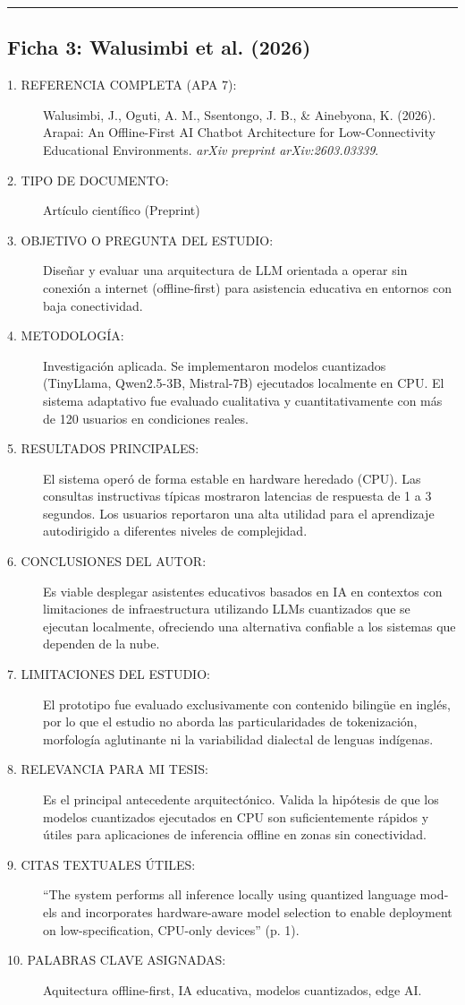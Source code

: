 \vspace{0.5cm}
\hrule
\vspace{0.5cm}

\subsection*{Ficha 3: Walusimbi et al. (2026)}
\begin{description}
	\item[1. REFERENCIA COMPLETA (APA 7):] Walusimbi, J., Oguti, A. M., Ssentongo, J. B., \& Ainebyona, K. (2026). Arapai: An Offline-First AI Chatbot Architecture for Low-Connectivity Educational Environments. \textit{arXiv preprint arXiv:2603.03339}.
	\item[2. TIPO DE DOCUMENTO:] Artículo científico (Preprint)
	\item[3. OBJETIVO O PREGUNTA DEL ESTUDIO:] Diseñar y evaluar una arquitectura de LLM orientada a operar sin conexión a internet (offline-first) para asistencia educativa en entornos con baja conectividad.
	\item[4. METODOLOGÍA:] Investigación aplicada. Se implementaron modelos cuantizados (TinyLlama, Qwen2.5-3B, Mistral-7B) ejecutados localmente en CPU. El sistema adaptativo fue evaluado cualitativa y cuantitativamente con más de 120 usuarios en condiciones reales.
	\item[5. RESULTADOS PRINCIPALES:] El sistema operó de forma estable en hardware heredado (CPU). Las consultas instructivas típicas mostraron latencias de respuesta de 1 a 3 segundos. Los usuarios reportaron una alta utilidad para el aprendizaje autodirigido a diferentes niveles de complejidad.
	\item[6. CONCLUSIONES DEL AUTOR:] Es viable desplegar asistentes educativos basados en IA en contextos con limitaciones de infraestructura utilizando LLMs cuantizados que se ejecutan localmente, ofreciendo una alternativa confiable a los sistemas que dependen de la nube.
	\item[7. LIMITACIONES DEL ESTUDIO:] El prototipo fue evaluado exclusivamente con contenido bilingüe en inglés, por lo que el estudio no aborda las particularidades de tokenización, morfología aglutinante ni la variabilidad dialectal de lenguas indígenas.
	\item[8. RELEVANCIA PARA MI TESIS:] Es el principal antecedente arquitectónico. Valida la hipótesis de que los modelos cuantizados ejecutados en CPU son suficientemente rápidos y útiles para aplicaciones de inferencia offline en zonas sin conectividad.
	\item[9. CITAS TEXTUALES ÚTILES:] \foreignlanguage{english}{``The system performs all inference locally using quantized language models and incorporates hardware-aware model selection to enable deployment on low-specification, CPU-only devices''} (p. 1).
	\item[10. PALABRAS CLAVE ASIGNADAS:] Aquitectura offline-first, IA educativa, modelos cuantizados, edge AI.
\end{description}


